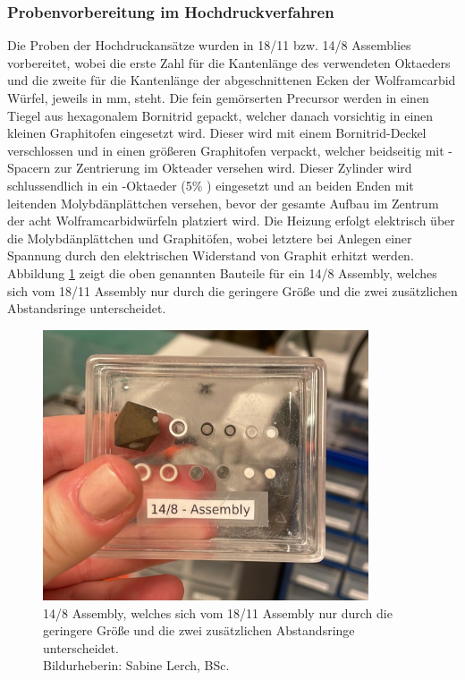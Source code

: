 \documentclass[12pt]{article}
\begin{document}
\subsubsection{Probenvorbereitung im Hochdruckverfahren}
Die Proben der Hochdruckansätze wurden in 18/11 bzw. 14/8 Assemblies vorbereitet, wobei die erste Zahl für die Kantenlänge des verwendeten Oktaeders und die zweite für die Kantenlänge der abgeschnittenen Ecken der Wolframcarbid Würfel, jeweils in mm, steht. 
Die fein gemörserten Precursor werden in einen Tiegel aus hexagonalem Bornitrid gepackt, welcher danach vorsichtig in einen kleinen Graphitofen eingesetzt wird.
Dieser wird mit einem Bornitrid-Deckel verschlossen und in einen größeren  Graphitofen verpackt, welcher beidseitig mit -Spacern zur Zentrierung im Okteader versehen wird.
Dieser Zylinder wird schlussendlich in ein -Oktaeder (5\% ) eingesetzt und an beiden Enden mit leitenden Molybdänplättchen versehen, bevor der gesamte Aufbau im Zentrum der acht Wolframcarbidwürfeln platziert wird. Die Heizung erfolgt elektrisch über die Molybdänplättchen und Graphitöfen, wobei letztere bei Anlegen einer Spannung durch den elektrischen Widerstand von Graphit erhitzt werden.
Abbildung \ref{fig:14-8} zeigt die oben genannten Bauteile für ein 14/8 Assembly, welches sich vom 18/11 Assembly nur durch die geringere Größe und die zwei zusätzlichen  Abstandsringe unterscheidet.
\begin{figure}[H]
    \centering
    \includegraphics[height=8cm]{Images/14-8.jpg}
    \caption{14/8 Assembly, welches sich vom 18/11 Assembly nur durch die geringere Größe und die zwei zusätzlichen  Abstandsringe unterscheidet. \\Bildurheberin: Sabine Lerch, BSc.}  
    \label{fig:14-8}
\end{figure}
\end{document}
